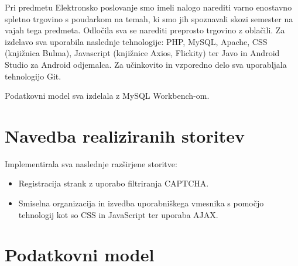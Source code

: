 \documentclass[a4paper,12pt]{report}
\begin{document}
Pri predmetu Elektronsko poslovanje smo imeli nalogo narediti varno enostavno spletno trgovino s poudarkom na temah, ki smo jih spoznavali skozi semester na vajah tega predmeta. Odločila sva se narediti preprosto trgovino z oblačili. Za izdelavo sva uporabila naslednje tehnologije: PHP, MySQL, Apache, CSS (knjižnica Bulma), Javascript (knjižnice Axios, Flickity) ter Javo in Android Studio za Android odjemalca. Za učinkovito in vzporedno delo sva uporabljala tehnologijo Git.

Podatkovni model sva izdelala z MySQL Workbench-om. 


\chapter{Navedba realiziranih storitev}

Implementirala sva naslednje razširjene storitve:

\begin{itemize}
    \item Registracija strank z uporabo filtriranja CAPTCHA.
    \item Smiselna organizacija in izvedba uporabniškega vmesnika s pomočjo tehnologij kot so CSS in JavaScript ter uporaba AJAX.
\end{itemize}


\chapter{Podatkovni model}
\end{document}
